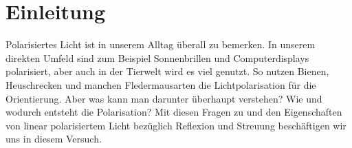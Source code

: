 

\chapter{Einleitung}
\label{chap:einleitung}
Polarisiertes Licht ist in unserem Alltag überall zu bemerken. In unserem direkten Umfeld sind zum Beispiel Sonnenbrillen und Computerdisplays polarisiert, aber auch in der Tierwelt wird es viel genutzt. So nutzen Bienen, Heuschrecken und manchen Fledermausarten die Lichtpolarisation für die Orientierung. 
Aber was kann man darunter überhaupt verstehen? Wie und wodurch entsteht die Polarisation? Mit diesen Fragen zu und den Eigenschaften von linear polarisiertem Licht bezüglich Reflexion und Streuung beschäftigen wir uns in diesem Versuch. 
